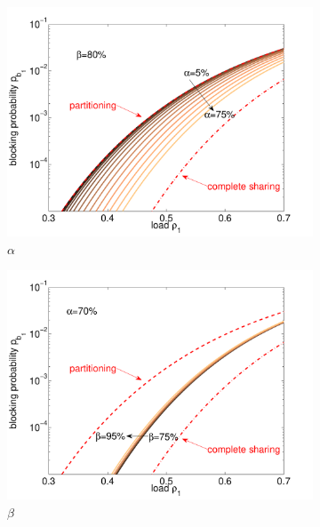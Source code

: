 \begin{figure}[tb]
\centering
\begin{subfigure}{.49\textwidth}
 \centering
 \includegraphics[width=\linewidth]{aggregation/performance_model/figures/m2_n20_alpha_equal}
 \caption{$\alpha$}
 \label{fig:m2_n20_alpha}
\end{subfigure}%
\begin{subfigure}{.49\textwidth}
 \centering
 \includegraphics[width=\linewidth]{aggregation/performance_model/figures/m2_n20_beta_equal}
 \caption{$\beta$}
 \label{fig:m2_n20_beta}
\end{subfigure}
\begin{subfigure}{.49\textwidth}
 \centering

\end{subfigure}
\end{figure}
